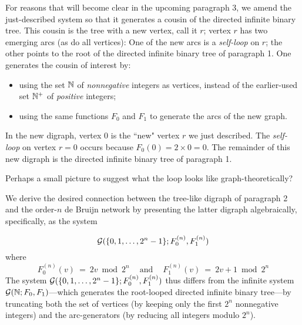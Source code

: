 For reasons that will become clear in the upcoming paragraph 3, we amend the just-described
system so that it generates a cousin of the directed infinite binary tree.  This cousin is the tree
with a new vertex, call it $r$; vertex $r$ has two emerging arcs (as do all vertices): One of the 
new arcs is a {\em self-loop} on $r$; the other points to the root of the
directed infinite binary tree of paragraph 1.  One generates the cousin of interest by:
\begin{itemize}
\item
using the set $\mathbb{N}$ of {\em nonnegative} integers as vertices, instead of the earlier-used
set $\mathbb{N}^+$ of {\em positive} integers;
\item
using the same functions $F_0$ and $F_1$ to generate the arcs of the new graph.
\end{itemize}
In the new digraph, vertex $0$ is the ``new" vertex $r$ we just described.  The {\em self-loop} on
vertex $r=0$ occurs because $F_0(0) = 2 \times 0 = 0$.  The remainder of this new digraph is the
directed infinite binary tree of paragraph 1.

{\Arny Perhaps a small picture to suggest what the loop looks like graph-theoretically?}

\medskip

We derive the desired connection between the tree-like digraph of paragraph 2 and the order-$n$
de Bruijn network by presenting the latter digraph algebraically, specifically, as the system 

\[ \mbox{$\cal G$}(\{0, 1, \ldots, 2^n-1\}; F^{(n)}_0, F^{(n)}_1) \]
where
\[ F^{(n)}_0(v) \ = \ 2v \bmod 2^n \ \ \ \ \mbox{ and } \ \ \ \ F^{(n)}_1(v) \ = \ 2v +1 \bmod 2^n \]
The system $\mbox{$\cal G$}(\{0, 1, \ldots, 2^n-1\}; F^{(n)}_0, F^{(n)}_1)$ thus differs from the infinite system 
$\mbox{$\cal G$}(\mathbb{N}; F_0, F_1)$---which generates the root-looped directed infinite binary tree---by truncating
both the set of vertices (by keeping only the first $2^n$ nonnegative integers) and the arc-generators
(by reducing all integers modulo $2^n$).

